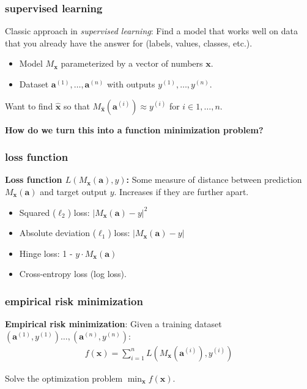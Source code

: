 \documentclass[compress]{beamer}
\newcommand{\bv}[1]{\mathbf{#1}}
\begin{document}
\begin{frame}
	\frametitle{supervised learning}
	Classic approach in \emph{supervised learning}: Find a model that works well on data that you already have the answer for (labels, values, classes, etc.).
	\begin{itemize}
		\item Model $M_{\bv{x}}$ parameterized by a vector of numbers $\bv{x}$.
		\item Dataset $\bv{a}^{(1)}, \ldots,  \bv{a}^{(n)}$ with outputs $y^{(1)}, \ldots, y^{(n)}$.
	\end{itemize}
	\begin{center}
		Want to find $\hat{\bv{x}}$ so that $M_{\hat{\bv{x}}}(\bv{a}^{(i)}) \approx y^{(i)}$ for $i \in 1,\ldots, n$.
		
		\alert{\textbf{How do we turn this into a function minimization problem?}}
	\end{center}
\end{frame}

\begin{frame}
	\frametitle{loss function}
	\textbf{Loss function $L\left(M_{\bv{x}}(\bv{a}), y\right)$:} Some measure of distance between prediction $M_{\bv{x}}(\bv{a})$ and target output $y$. Increases if they are further apart.
	\begin{itemize}
		\item Squared ($\ell_2$) loss: $|M_{{\bv{x}}}(\bv{a}) - y|^2$
		\item Absolute deviation ($\ell_1$) loss: $|M_{{\bv{x}}}(\bv{a}) - y|$
		\item Hinge loss: 1 - $y \cdot M_{{\bv{x}}}(\bv{a})$ 
		\item Cross-entropy loss (log loss). 
	\end{itemize}
\end{frame}

\begin{frame}
	\frametitle{empirical risk minimization}
	\textbf{Empirical risk minimization}: Given a training dataset $(\bv{a}^{(1)},y^{(1)}) \ldots,  (\bv{a}^{(n)},y^{(n)})$:
	\begin{align*}
		f(\bv{x}) = \sum_{i=1}^n L\left(M_{\bv{x}}(\bv{a}^{(i)}), y^{(i)}\right)
	\end{align*}
	\begin{center}
		Solve the optimization problem $\min_{\bv{x}} f(\bv{x})$.
	\end{center}
\end{frame}
\end{document}
